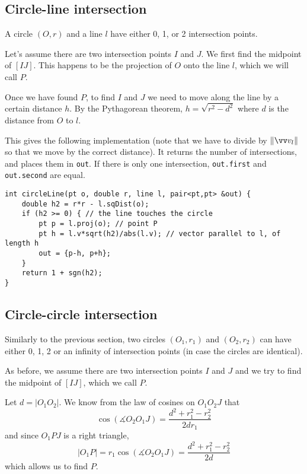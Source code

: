 \subsection{Circle-line intersection}
A circle $(O,r)$ and a line $l$ have either 0, 1, or 2 intersection points.


Let's assume there are two intersection points $I$ and $J$. We first find the midpoint of $[IJ]$. This happens to be the projection of $O$ onto the line $l$, which we will call $P$.


Once we have found $P$, to find $I$ and $J$ we need to move along the line by a certain distance $h$. By the Pythagorean theorem, $h=\sqrt{r^2-d^2}$ where $d$ is the distance from $O$ to $l$.

This gives the following implementation (note that we have to divide by $\norm{\dirof{l}}$ so that we move by the correct distance). It returns the number of intersections, and places them in \lstinline|out|. If there is only one intersection, \lstinline|out.first| and \lstinline|out.second| are equal.
\begin{lstlisting}
int circleLine(pt o, double r, line l, pair<pt,pt> &out) {
    double h2 = r*r - l.sqDist(o);
    if (h2 >= 0) { // the line touches the circle
        pt p = l.proj(o); // point P
        pt h = l.v*sqrt(h2)/abs(l.v); // vector parallel to l, of length h
        out = {p-h, p+h};
    }
    return 1 + sgn(h2);
}
\end{lstlisting}

\subsection{Circle-circle intersection}
Similarly to the previous section, two circles $(O_1,r_1)$ and $(O_2,r_2)$ can have either 0, 1, 2 or an infinity of intersection points (in case the circles are identical).


As before, we assume there are two intersection points $I$ and $J$ and we try to find the midpoint of $[IJ]$, which we call $P$.


Let $d=|O_1O_2|$. We know from the law of cosines on $O_1O_2J$ that
\[\cos(\measuredangle{O_2O_1J}) = \frac{d^2 + r_1^2 - r_2^2}{2dr_1}\]
and since $O_1PJ$ is a right triangle,
\[|O_1P| = r_1\cos(\measuredangle{O_2O_1J}) = \frac{d^2 + r_1^2 - r_2^2}{2d}\]
which allows us to find $P$.

